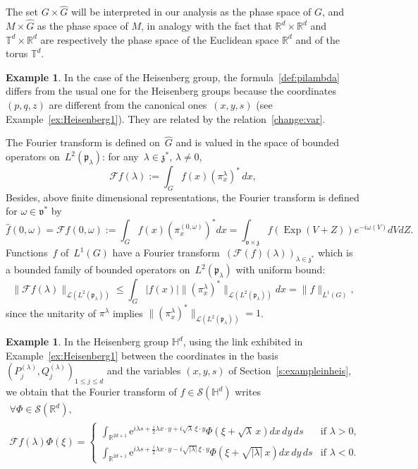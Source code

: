 \documentclass[10pt]{amsart}
\let\mathcal\mathscr
\newcommand{\rme}{\mathrm{e}}
\DeclareMathOperator{\Exp}{Exp}
\theoremstyle{plain}
\theoremstyle{definition}
\newtheorem{example}[theorem]{Example}
\def\R{{\mathbb R}}
\def\T{{\mathbb T}}
\def\bbH{{\mathbb H}}
\let\dpl\displaystyle
\begin{document}
The set $G\times \widehat G$ will be interpreted in our analysis as the phase space of $G$, and $M\times \widehat G$ as the phase space of $M$, in analogy with the fact that $\R^d\times \R^d$ and $\T^d\times \R^d$ are respectively the phase space of the Euclidean space $\R^d$ and of the torus $\T^d$.

\begin{example}
In the case of the Heisenberg group, the formula~\eqref{def:pilambda} differs from
the usual one for the Heisenberg groups \cite[Eq.\,(2.23) in Chap.\,1]{Tay} because the coordinates $(p,q,z)$ are different from the canonical ones~$(x,y,s)$ (see Example~\ref{ex:Heisenberg1}). They are related by the relation~\eqref{change:var}.
\end{example}

The Fourier transform is defined on~$\widehat G$ and is valued in the space of bounded operators
on~$L^2(\mathfrak p_\lambda)$:
for any~$\lambda\in{\mathfrak z}^*$, $\lambda\not=0$,
\begin{equation} \label{e:fouriertransform}
{\mathcal F}f(\lambda):=
\int_G f(x)\left(\pi^{\lambda}_{x }\right)^* \, dx,
\end{equation}
Besides, above finite dimensional representations, the Fourier transform is defined
for $\omega\in \mathfrak v^*$ by
\[
\widehat f(0,\omega)=
\mathcal F f (0,\omega)
:= \int_G f(x) (\pi^{(0,\omega)}_x)^* dx
=\int_{\mathfrak v \times \mathfrak z}
f(\Exp(V+Z)) e^{-i\omega(V)} dV dZ.	
\]
Functions~$f$ of~$L^1(G)$ have a Fourier transform~$\left({\mathcal F}(f)(\lambda)\right)_{\lambda\in \mathfrak z^*}$ which is a bounded family of bounded operators on~$L^2(\mathfrak p_\lambda)$
with uniform bound:
\[
\|\mathcal Ff (\lambda) \|_{{\mathcal L}(L^2(\mathfrak p_\lambda))}
\leq
\int_G |f(x)|\|(\pi^\lambda_x)^* \|_{{\mathcal L}(L^2(\mathfrak p_\lambda))} dx
=
\|f\|_{L^1(G)},
\]
since the unitarity of $\pi^\lambda$ implies $\|(\pi^\lambda_x)^* \|_{{\mathcal L}(L^2(\mathfrak p_\lambda))}=1$.

\begin{example}\label{ex:Heisenberg2}
In the Heisenberg group $\bbH^d$, using the link exhibited in Example~\ref{ex:Heisenberg1} between the coordinates in the basis $(P_j^{(\lambda)},Q_j^{(\lambda)})_{1\leq j\leq d}$ and the variables $(x,y,s)$ of Section~\ref{s:exampleinheis}, we obtain that the Fourier transform of $f\in\mathcal S(\bbH^d)$ writes
\begin{multline*}
\forall \Phi\in \mathcal S(\R^d),\\[-5pt]
\mathcal Ff(\lambda) \Phi(\xi)=
\begin{cases}
\dpl
\int_{\R^{2d+1} }\rme^{i\lambda s + \frac i 2 \lambda x\cdot y + i\sqrt\lambda\, \xi\cdot y } \Phi(\xi +\sqrt\lambda \,x) dx\, dy\, ds& \text{if } \lambda>0,\\[8pt]
\dpl\int_{\R^{2d+1} }\rme^{i\lambda s + \frac i 2 \lambda x\cdot y - i\sqrt{|\lambda|}\, \xi\cdot y } \Phi(\xi +\sqrt{|\lambda|} \, x) dx\, dy\, ds& \text{if } \lambda<0.
\end{cases}
\end{multline*}
\end{example}
\end{document}
